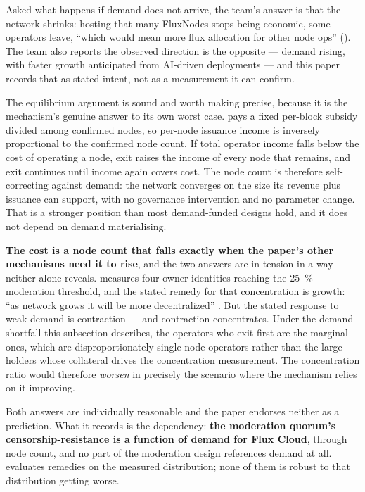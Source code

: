 \begin{remark}
\label{rem:pnr:contraction}
Asked what happens if demand does not arrive, the team's answer is that the network shrinks: hosting
that many FluxNodes stops being economic, some operators leave, ``which would mean more flux
allocation for other node ops''  (\planned). The team
also reports the observed direction is the opposite --- demand rising, with faster growth
anticipated from AI-driven deployments --- and this paper records that as stated intent, not as a
measurement it can confirm.

The equilibrium argument is sound and worth making precise, because it is the mechanism's genuine
answer to its own worst case. \PoN{} pays a fixed per-block subsidy divided among confirmed nodes,
so per-node issuance income is inversely proportional to the confirmed node count. If total operator
income falls below the cost of operating a node, exit raises the income of every node that remains,
and exit continues until income again covers cost. The node count is therefore self-correcting
against demand: the network converges on the size its revenue plus issuance can support, with no
governance intervention and no parameter change. That is a stronger position than most
demand-funded designs hold, and it does not depend on demand materialising.

\textbf{The cost is a node count that falls exactly when the paper's other mechanisms need it to
rise}, and the two answers are in tension in a way neither alone reveals.
 measures four owner identities reaching the \SI{25}{\percent}
moderation threshold, and the stated remedy for that concentration is growth: ``as network grows it
will be more decentralized'' . But the stated response to
weak demand is contraction --- and contraction concentrates. Under the demand shortfall this
subsection describes, the operators who exit first are the marginal ones, which are disproportionately
single-node operators rather than the large holders whose collateral drives the concentration
measurement. The concentration ratio would therefore \emph{worsen} in precisely the scenario where
the mechanism relies on it improving.

Both answers are individually reasonable and the paper endorses neither as a prediction. What it
records is the dependency: \textbf{the moderation quorum's censorship-resistance is a function of
demand for Flux Cloud}, through node count, and no part of the moderation design references demand at
all.  evaluates remedies on the measured distribution; none of them is robust
to that distribution getting worse.
\end{remark}

